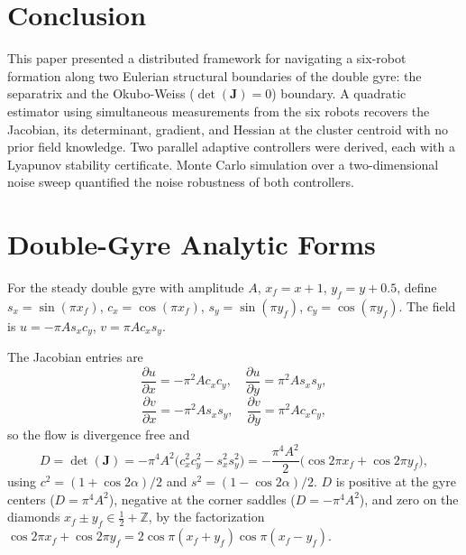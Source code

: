 \documentclass[lettersize,journal]{IEEEtran}
\begin{document}
\section{Conclusion}
\label{sec:conclusion}

This paper presented a distributed framework for navigating a six-robot
formation along two Eulerian structural boundaries of the double gyre: the
separatrix and the Okubo-Weiss ($\det(\mathbf{J}) = 0$) boundary. A quadratic
estimator using simultaneous measurements from the six robots recovers the
Jacobian, its determinant, gradient, and Hessian at the cluster centroid with
no prior field knowledge. Two parallel adaptive controllers were derived, each
with a Lyapunov stability certificate. Monte Carlo simulation over a
two-dimensional noise sweep quantified the noise robustness of both
controllers.



\appendices

\section{Double-Gyre Analytic Forms}
\label{app:analytic}

For the steady double gyre with amplitude $A$, $x_f = x + 1$,
$y_f = y + 0.5$, define $s_x = \sin(\pi x_f)$, $c_x = \cos(\pi x_f)$,
$s_y = \sin(\pi y_f)$, $c_y = \cos(\pi y_f)$. The field is
$u = -\pi A s_x c_y$, $v = \pi A c_x s_y$.

The Jacobian entries are
\begin{equation}
    \frac{\partial u}{\partial x} = -\pi^2 A c_x c_y, \quad
    \frac{\partial u}{\partial y} =  \pi^2 A s_x s_y,
\end{equation}
\begin{equation}
    \frac{\partial v}{\partial x} = -\pi^2 A s_x s_y, \quad
    \frac{\partial v}{\partial y} =  \pi^2 A c_x c_y,
\end{equation}
so the flow is divergence free and
\begin{equation}
    D = \det(\mathbf{J})
      = -\pi^4 A^2 \bigl(c_x^2 c_y^2 - s_x^2 s_y^2\bigr)
      = -\frac{\pi^4 A^2}{2}\bigl(\cos 2\pi x_f + \cos 2\pi y_f\bigr),
    \label{eq:det_analytic}
\end{equation}
using $c^2 = (1+\cos 2\alpha)/2$ and $s^2 = (1-\cos 2\alpha)/2$. $D$ is
positive at the gyre centers ($D = \pi^4 A^2$), negative at the corner
saddles ($D = -\pi^4 A^2$), and zero on the diamonds
$x_f \pm y_f \in \tfrac{1}{2} + \mathbb{Z}$, by the factorization
$\cos 2\pi x_f + \cos 2\pi y_f = 2\cos\pi(x_f+y_f)\cos\pi(x_f-y_f)$.
\end{document}
